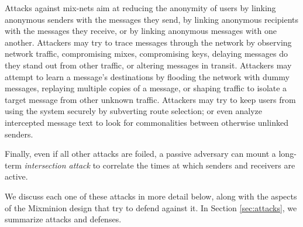 \documentclass[11pt]{IEEEtran}
\begin{document}
Attacks against mix-nets aim at reducing the anonymity of users by
linking anonymous senders with the messages they send, by linking
anonymous recipients with the messages they receive, or by linking
anonymous messages with one another.  Attackers may
try to trace messages through the network by observing network
traffic, compromising mixes, compromising keys, delaying messages
do they stand out from other traffic, or altering messages
in transit.  Attackers may attempt to learn a message's destinations
by flooding the network with dummy messages, replaying multiple copies
of a message, or shaping traffic to isolate a target message from
other unknown traffic.  Attackers may try to keep users from using
the system securely by subverting route selection; or even analyze
intercepted message text to look for commonalities between otherwise
unlinked senders.

Finally, even if all other attacks are foiled, a passive adversary can
mount a long-term \emph{intersection attack} to correlate the times at
which senders and receivers are active.

We discuss each one of these attacks in more detail below, along with the
aspects of the Mixminion design that try to defend against it.  In
Section \ref{sec:attacks}, we summarize attacks and defenses.



\end{document}
